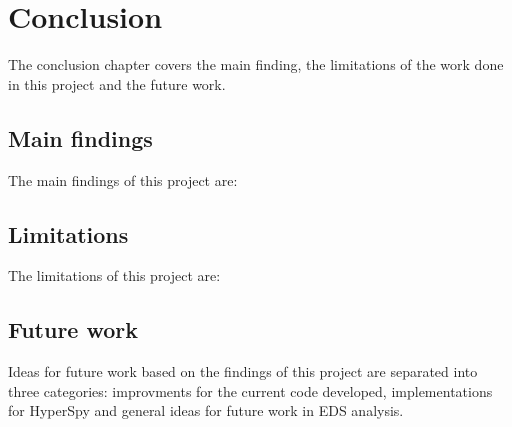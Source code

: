 
\chapter{Conclusion}
\label{chap:conclusion}


The conclusion chapter covers the main finding, the limitations of the work done in this project and the future work.

\section{Main findings}
\label{sec:mainfindings}

The main findings of this project are:






\section{Limitations}
\label{sec:limitations}

The limitations of this project are:




\section{Future work}
\label{sec:futurework}

Ideas for future work based on the findings of this project are separated into three categories: improvments for the current code developed, implementations for HyperSpy and general ideas for future work in EDS analysis.











